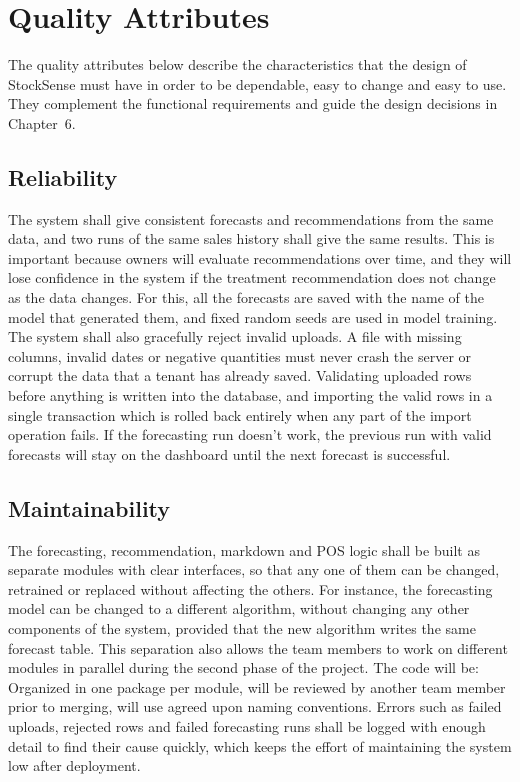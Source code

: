 \documentclass{StockSense}
\begin{document}
\section{Quality Attributes}

The quality attributes below describe the characteristics that the design of StockSense must have in order to be dependable, easy to change and easy to use. They complement the functional requirements and guide the design decisions in Chapter~6.

\subsection{Reliability}

The system shall give consistent forecasts and recommendations from the same data, and two runs of the same sales history shall give the same results. This is important because owners will evaluate recommendations over time, and they will lose confidence in the system if the treatment recommendation does not change as the data changes. For this, all the forecasts are saved with the name of the model that generated them, and fixed random seeds are used in model training. The system shall also gracefully reject invalid uploads. A file with missing columns, invalid dates or negative quantities must never crash the server or corrupt the data that a tenant has already saved. Validating uploaded rows before anything is written into the database, and importing the valid rows in a single transaction which is rolled back entirely when any part of the import operation fails. If the forecasting run doesn't work, the previous run with valid forecasts will stay on the dashboard until the next forecast is successful.

\subsection{Maintainability}

The forecasting, recommendation, markdown and POS logic shall be built as separate modules with clear interfaces, so that any one of them can be changed, retrained or replaced without affecting the others. For instance, the forecasting model can be changed to a different algorithm, without changing any other components of the system, provided that the new algorithm writes the same forecast table. This separation also allows the team members to work on different modules in parallel during the second phase of the project. The code will be: Organized in one package per module, will be reviewed by another team member prior to merging, will use agreed upon naming conventions. Errors such as failed uploads, rejected rows and failed forecasting runs shall be logged with enough detail to find their cause quickly, which keeps the effort of maintaining the system low after deployment.
\end{document}
